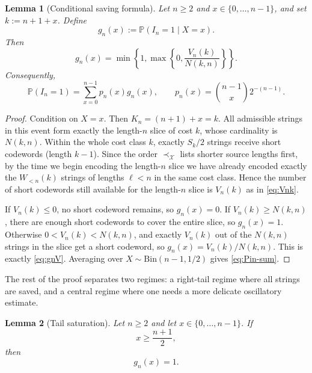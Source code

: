 \documentclass[10pt,a4paper]{article}
\newtheorem{lemma}{Lemma}
\theoremstyle{definition}
\theoremstyle{remark}
\newcommand{\1}{\mathbf{1}}
\newcommand{\PP}{\mathbb{P}}
\begin{document}
\begin{lemma}[Conditional saving formula]\label{lem:cond}
Let $n\ge2$ and $x\in\{0,\dots,n-1\}$, and set $k:=n+1+x$. Define
\[
g_n(x):=\PP(I_n=1\mid X=x).
\]
Then
\begin{equation}\label{eq:gnV}
g_n(x)=\min\!\left\{1,\max\!\left\{0,\frac{V_n(k)}{N(k,n)}\right\}\right\}.
\end{equation}
Consequently,
\begin{equation}\label{eq:Pin-sum}
\PP(I_n=1)=\sum_{x=0}^{n-1}p_n(x)g_n(x),
\qquad
p_n(x)=\binom{n-1}{x}2^{-(n-1)}.
\end{equation}
\end{lemma}

\begin{proof}
Condition on $X=x$. Then $K_n=(n+1)+x=k$. All admissible strings in this event form exactly the length-$n$ slice of cost $k$, whose cardinality is $N(k,n)$. Within the whole cost class $k$, exactly $S_k/2$ strings receive short codewords (length $k-1$). Since the order $\prec_{\mathcal X}$ lists shorter source lengths first, by the time we begin encoding the length-$n$ slice we have already encoded exactly the $W_{<n}(k)$ strings of lengths $\ell<n$ in the same cost class. Hence the number of short codewords still available for the length-$n$ slice is $V_n(k)$ as in \eqref{eq:Vnk}.

If $V_n(k)\le0$, no short codeword remains, so $g_n(x)=0$. If $V_n(k)\ge N(k,n)$, there are enough short codewords to cover the entire slice, so $g_n(x)=1$. Otherwise $0<V_n(k)<N(k,n)$, and exactly $V_n(k)$ out of the $N(k,n)$ strings in the slice get a short codeword, so $g_n(x)=V_n(k)/N(k,n)$. This is exactly \eqref{eq:gnV}. Averaging over $X\sim\mathrm{Bin}(n-1,1/2)$ gives \eqref{eq:Pin-sum}.
\end{proof}

The rest of the proof separates two regimes: a right-tail regime where all strings are saved, and a central regime where one needs a more delicate oscillatory estimate.

\begin{lemma}[Tail saturation]\label{lem:tail}
Let $n\ge2$ and let $x\in\{0,\dots,n-1\}$. If
\[
x\ge \frac{n+1}{2},
\]
then
\[
g_n(x)=1.
\]
\end{lemma}
\end{document}

